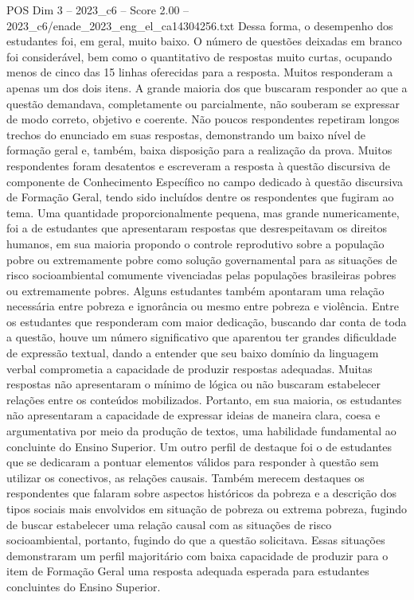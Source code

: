 \begin{textsample}{POS Dim 3 – 2023\_c6 – Score 2.00 – 2023\_c6/enade\_2023\_eng\_el\_ca14304256.txt}
Dessa forma, o desempenho dos estudantes foi, em geral, muito baixo.
O número de questões deixadas em branco foi considerável, bem como o quantitativo de respostas muito curtas, ocupando menos de cinco das 15 linhas oferecidas para a resposta.
Muitos responderam a apenas um dos dois itens.
A grande maioria dos que buscaram responder ao que a questão demandava, completamente ou parcialmente, não souberam se expressar de modo correto, objetivo e coerente.
Não poucos respondentes repetiram longos trechos do enunciado em suas respostas, demonstrando um baixo nível de formação geral e, também, baixa disposição para a realização da prova.
Muitos respondentes foram desatentos e escreveram a resposta à questão discursiva de componente de Conhecimento Específico no campo dedicado à questão discursiva de Formação Geral, tendo sido incluídos dentre os respondentes que fugiram ao tema.
Uma quantidade proporcionalmente pequena, mas grande numericamente, foi a de estudantes que apresentaram respostas que desrespeitavam os direitos humanos, em sua maioria propondo o controle reprodutivo sobre a população pobre ou extremamente pobre como solução governamental para as situações de risco socioambiental comumente vivenciadas pelas populações brasileiras pobres ou extremamente pobres.
Alguns estudantes também apontaram uma relação necessária entre pobreza e ignorância ou mesmo entre pobreza e violência.
Entre os estudantes que responderam com maior dedicação, buscando dar conta de toda a questão, houve um número significativo que aparentou ter grandes dificuldade de expressão textual, dando a entender que seu baixo domínio da linguagem verbal comprometia a capacidade de produzir respostas adequadas.
Muitas respostas não apresentaram o mínimo de lógica ou não buscaram estabelecer relações entre os conteúdos mobilizados.
Portanto, em sua maioria, os estudantes não apresentaram a capacidade de expressar ideias de maneira clara, coesa e argumentativa por meio da produção de textos, uma habilidade fundamental ao concluinte do Ensino Superior.
Um outro perfil de destaque foi o de estudantes que se dedicaram a pontuar elementos válidos para responder à questão sem utilizar os conectivos, as relações causais.
Também merecem destaques os respondentes que falaram sobre aspectos históricos da pobreza e a descrição dos tipos sociais mais envolvidos em situação de pobreza ou extrema pobreza, fugindo de buscar estabelecer uma relação causal com as situações de risco socioambiental, portanto, fugindo do que a questão solicitava.
Essas situações demonstraram um perfil majoritário com baixa capacidade de produzir para o item de Formação Geral uma resposta adequada esperada para estudantes concluintes do Ensino Superior.

\end{textsample}
